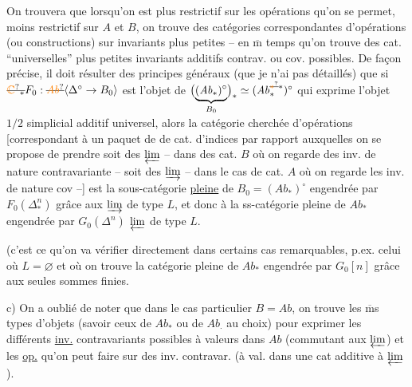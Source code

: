 On trouvera que lorsqu'on est plus
restrictif sur les opérations qu'on
se permet,   moins restrictif
sur $A$ et $B$, on trouve des catégories
correspondantes d'opérations (ou constructions)
sur invariants plus petites -- 
en $\overline{\mathrm m}$ temps qu'on trouve des cat.
``universelles'' plus petites  
invariants additifs contrav. ou cov.
possibles.  De façon précise, il doit
résulter des principes généraux (que je
n'ai pas détaillés) que si $\deleted{\unsure{\mathbb C}_{\ast}}F_0:\deleted{\unsure{\mathit{Ab}}}\inserted{\Delta^{\circ}\to B_0}$
est l'objet de $\bigl(\underbrace{(\mathit{Ab}_{\ast})^{\circ}}_{B_0}\bigr)_{\ast}
\simeq(\mathit{Ab}_{\ast}^{\deleted{\unsure{\ast}}\ast})^{\circ}$
qui exprime l'objet  $1/2$ simplicial
additif universel, alors la  catégorie
cherchée d'opérations [correspondant à
un paquet de de cat. d'indices par
rapport auxquelles on se propose de
prendre soit des $\varprojlim$ -- dans des cat.
$B$ où on regarde des inv. de nature
contravariante -- soit des $\varinjlim$ -- dans
le cas de cat. $A$ où on regarde les inv. de
nature cov --] est la sous-catégorie \uline{pleine}
 de $B_0=(\mathit{Ab}_{\ast})^{\circ}$ engendrée par  $F_0(\Delta_{\ast}^{n})$ grâce
aux $\varinjlim$ de type $L$, et  
donc à la ss-catégorie pleine de $\mathit{Ab}_{\ast}$
engendrée par  $G_0(\Delta^n)$   $\varprojlim$ de type $L$.


(c'est ce qu'on va vérifier directement dans
certains cas remarquables, p.ex. celui où
$L=\varnothing$ et où on trouve la  catégorie pleine
de $\mathit{Ab}_{\ast}$ engendrée par  $G_0[n]$ grâce aux
seules sommes finies.

c) On a oublié de noter que 
dans le cas particulier $B=\mathit{Ab}$,
on trouve les $\overline{\mathrm m}$s types d'objets
(savoir ceux de $\mathit{Ab}_{\ast}$ ou de $\mathit{Ab}_{\cdot}$ au
choix) pour exprimer les différents
\uline{inv.} contravariants  possibles à valeurs
dans $\mathit{Ab}$ (commutant aux $\varprojlim$) et
les \uline{op.} \inserted{$\Omega$} qu'on peut faire sur des
inv. contravar.   (à val.
dans une cat  additive à $\varprojlim$).

